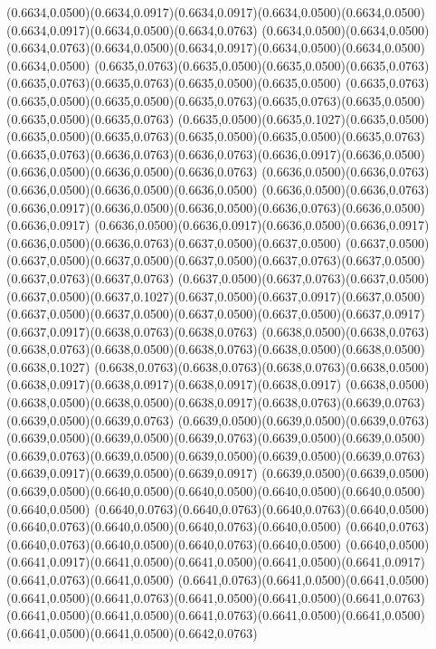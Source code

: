 (0.6634,0.0500)(0.6634,0.0917)(0.6634,0.0917)(0.6634,0.0500)(0.6634,0.0500)(0.6634,0.0917)(0.6634,0.0500)(0.6634,0.0763)
(0.6634,0.0500)(0.6634,0.0500)(0.6634,0.0763)(0.6634,0.0500)(0.6634,0.0917)(0.6634,0.0500)(0.6634,0.0500)(0.6634,0.0500)
(0.6635,0.0763)(0.6635,0.0500)(0.6635,0.0500)(0.6635,0.0763)(0.6635,0.0763)(0.6635,0.0763)(0.6635,0.0500)(0.6635,0.0500)
(0.6635,0.0763)(0.6635,0.0500)(0.6635,0.0500)(0.6635,0.0763)(0.6635,0.0763)(0.6635,0.0500)(0.6635,0.0500)(0.6635,0.0763)
(0.6635,0.0500)(0.6635,0.1027)(0.6635,0.0500)(0.6635,0.0500)(0.6635,0.0763)(0.6635,0.0500)(0.6635,0.0500)(0.6635,0.0763)
(0.6635,0.0763)(0.6636,0.0763)(0.6636,0.0763)(0.6636,0.0917)(0.6636,0.0500)(0.6636,0.0500)(0.6636,0.0500)(0.6636,0.0763)
(0.6636,0.0500)(0.6636,0.0763)(0.6636,0.0500)(0.6636,0.0500)(0.6636,0.0500)
\PST@Solid(0.6636,0.0500)(0.6636,0.0763)(0.6636,0.0917)(0.6636,0.0500)(0.6636,0.0500)(0.6636,0.0763)(0.6636,0.0500)(0.6636,0.0917)
(0.6636,0.0500)(0.6636,0.0917)(0.6636,0.0500)(0.6636,0.0917)(0.6636,0.0500)(0.6636,0.0763)(0.6637,0.0500)(0.6637,0.0500)
(0.6637,0.0500)(0.6637,0.0500)(0.6637,0.0500)(0.6637,0.0500)(0.6637,0.0763)(0.6637,0.0500)(0.6637,0.0763)(0.6637,0.0763)
(0.6637,0.0500)(0.6637,0.0763)(0.6637,0.0500)(0.6637,0.0500)(0.6637,0.1027)(0.6637,0.0500)(0.6637,0.0917)(0.6637,0.0500)
(0.6637,0.0500)(0.6637,0.0500)(0.6637,0.0500)(0.6637,0.0500)(0.6637,0.0917)(0.6637,0.0917)(0.6638,0.0763)(0.6638,0.0763)
(0.6638,0.0500)(0.6638,0.0763)(0.6638,0.0763)(0.6638,0.0500)(0.6638,0.0763)(0.6638,0.0500)(0.6638,0.0500)(0.6638,0.1027)
(0.6638,0.0763)(0.6638,0.0763)(0.6638,0.0763)(0.6638,0.0500)(0.6638,0.0917)(0.6638,0.0917)(0.6638,0.0917)(0.6638,0.0917)
(0.6638,0.0500)(0.6638,0.0500)(0.6638,0.0500)(0.6638,0.0917)(0.6638,0.0763)(0.6639,0.0763)(0.6639,0.0500)(0.6639,0.0763)
(0.6639,0.0500)(0.6639,0.0500)(0.6639,0.0763)(0.6639,0.0500)(0.6639,0.0500)(0.6639,0.0763)(0.6639,0.0500)(0.6639,0.0500)
(0.6639,0.0763)(0.6639,0.0500)(0.6639,0.0500)(0.6639,0.0500)(0.6639,0.0763)(0.6639,0.0917)(0.6639,0.0500)(0.6639,0.0917)
(0.6639,0.0500)(0.6639,0.0500)(0.6639,0.0500)(0.6640,0.0500)(0.6640,0.0500)(0.6640,0.0500)(0.6640,0.0500)(0.6640,0.0500)
(0.6640,0.0763)(0.6640,0.0763)(0.6640,0.0763)(0.6640,0.0500)(0.6640,0.0763)(0.6640,0.0500)(0.6640,0.0763)(0.6640,0.0500)
(0.6640,0.0763)(0.6640,0.0763)(0.6640,0.0500)(0.6640,0.0763)(0.6640,0.0500)
\PST@Solid(0.6640,0.0500)(0.6641,0.0917)(0.6641,0.0500)(0.6641,0.0500)(0.6641,0.0500)(0.6641,0.0917)(0.6641,0.0763)(0.6641,0.0500)
(0.6641,0.0763)(0.6641,0.0500)(0.6641,0.0500)(0.6641,0.0500)(0.6641,0.0763)(0.6641,0.0500)(0.6641,0.0500)(0.6641,0.0763)
(0.6641,0.0500)(0.6641,0.0500)(0.6641,0.0763)(0.6641,0.0500)(0.6641,0.0500)(0.6641,0.0500)(0.6641,0.0500)(0.6642,0.0763)
